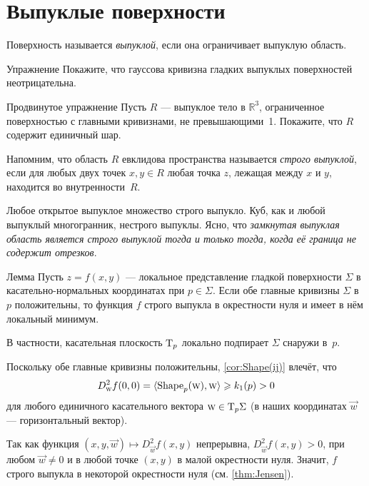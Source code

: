 \section{Выпуклые поверхности}

Поверхность называется \emph{выпуклой}, если она ограничивает выпуклую область.

\begin{thm}{Упражнение}\label{ex:convex-surf}
Покажите, что гауссова кривизна гладких выпуклых поверхностей неотрицательна.
\end{thm}

\begin{thm}{Продвинутое упражнение}\label{ex:convex-lagunov}
Пусть $R$ --- выпуклое тело в $\mathbb{R}^3$, ограниченное поверхностью с главными кривизнами, не превышающими~1.
Покажите, что $R$ содержит единичный шар.
\end{thm}

{\sloppy

Напомним, что область $R$ евклидова пространства называется {}\emph{строго выпуклой}, если для любых двух точек $x,y\in R$ любая точка $z$, лежащая между $x$ и $y$, находится во внутренности~$R$.

Любое открытое выпуклое множество строго выпукло. 
Куб, как и любой выпуклый многогранник, нестрого выпуклы.
Ясно, что \textit{замкнутая выпуклая область является строго выпуклой тогда и только тогда, когда её граница не содержит отрезков}.

}

\begin{thm}{Лемма}\label{lem:gauss+=>convexity}
Пусть $z=f(x,y)$ --- локальное представление гладкой поверхности $\Sigma$ в касательно-нормальных координатах при $p\in\Sigma$.
Если обе главные кривизны $\Sigma$ в~$p$ положительны,
то функция $f$ строго выпукла в окрестности нуля и имеет в нём локальный минимум.

В частности, касательная плоскость $\mathrm{T}_p$ локально подпирает $\Sigma$ снаружи в~$p$.
\end{thm}

Поскольку обе главные кривизны положительны, \ref{cor:Shape(ij)} влечёт, что 
\[D^2_{\text{\sc{w}}}f(0,0)=\langle \mathop{\rm Shape}\nolimits_p({\text{\sc{w}}}),{\text{\sc{w}}}\rangle\geqslant k_1(p)>0\] 
для любого единичного касательного вектора $\text{\sc{w}}\in\mathrm{T}_p\Sigma$ (в наших координатах $\vec w$ --- горизонтальный вектор).

Так как функция $(x,y,{\vec w})\mapsto D^2_{\vec w}f(x,y)$ непрерывна, $D^2_{\vec w}f(x,y)>0$, при любом $\vec w\ne 0$ и в любой точке $(x,y)$ в малой окрестности нуля.
Значит, $f$ строго выпукла в некоторой окрестности нуля (см. \ref{thm:Jensen}).

